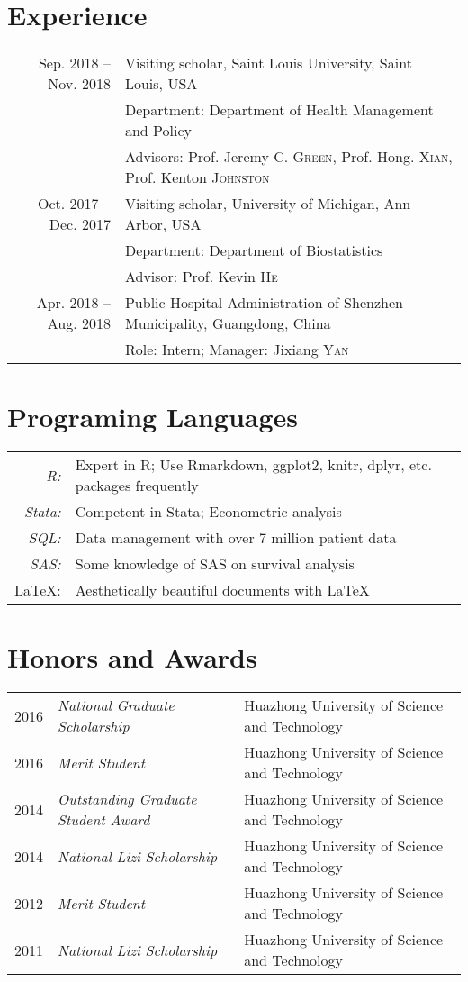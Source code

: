 \documentclass[a4paper,10pt]{article}
\begin{document}
\section{Experience}
\begin{tabular}{rl}
  Sep. 2018  -- Nov. 2018 & Visiting scholar, Saint Louis University, Saint Louis, USA\\
& \small Department: Department of Health Management and Policy\\
& \small Advisors: Prof. Jeremy C. \textsc{Green}, Prof. Hong. \textsc{Xian}, Prof. Kenton \textsc{Johnston}\\
 Oct. 2017  --  Dec. 2017 & Visiting scholar, University of Michigan, Ann Arbor, USA\\
& \small Department: Department of Biostatistics\\
& \small Advisor: Prof. Kevin \textsc{He}\\
 Apr. 2018 -- Aug. 2018 & Public Hospital Administration of Shenzhen Municipality, Guangdong, China \\
 & Role: Intern; Manager: Jixiang \textsc{Yan} \\
\end{tabular}


\section{Programing Languages}
\begin{tabular}{rl} 
	\textit{R:} & Expert in R; Use Rmarkdown, ggplot2, knitr, dplyr, etc. packages frequently\\
	\textit{Stata:} & Competent in Stata; Econometric analysis \\
	\textit{SQL:} & Data management with over 7 million patient data\\
	\textit{SAS:} & Some knowledge of SAS on survival analysis\\
	{\LaTeX}: & Aesthetically beautiful documents with \LaTeX
\end{tabular}

\section{Honors and Awards}
\begin{tabular}{rll}
2016 & \textit{National Graduate Scholarship} & Huazhong University of Science and Technology\\
2016 & \textit{Merit Student} &  Huazhong University of Science and Technology\\
2014 & 	\textit{Outstanding Graduate Student Award} & Huazhong University of Science and Technology\\
2014 & 	\textit{National Lizi Scholarship} &  Huazhong University of Science and Technology\\
2012 & 	\textit{Merit Student} & Huazhong University of Science and Technology\\
2011 & 	\textit{National Lizi Scholarship} & Huazhong University of Science and Technology
\end{tabular}
\end{document}
